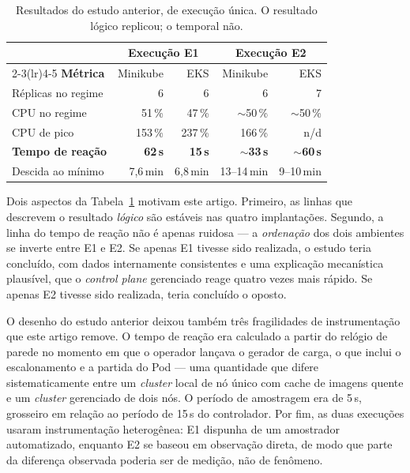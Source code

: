 \documentclass[conference]{IEEEtran}
\begin{document}
\begin{table}[!t]
\centering
\caption{Resultados do estudo anterior, de execução única. O resultado lógico
replicou; o temporal não.}
\label{tab:anterior}
\scriptsize
\begin{tabular}{@{}lrrrr@{}}
\toprule
& \multicolumn{2}{c}{\textbf{Execução E1}} & \multicolumn{2}{c}{\textbf{Execução E2}}\\
\cmidrule(lr){2-3}\cmidrule(lr){4-5}
\textbf{Métrica} & Minikube & EKS & Minikube & EKS\\
\midrule
Réplicas no regime & 6 & 6 & 6 & 7\\
CPU no regime & 51\,\% & 47\,\% & $\sim$50\,\% & $\sim$50\,\%\\
CPU de pico & 153\,\% & 237\,\% & 166\,\% & n/d\\
\textbf{Tempo de reação} & \textbf{62\,s} & \textbf{15\,s} & \textbf{$\sim$33\,s} & \textbf{$\sim$60\,s}\\
Descida ao mínimo & 7,6\,min & 6,8\,min & 13--14\,min & 9--10\,min\\
\bottomrule
\end{tabular}
\end{table}

Dois aspectos da Tabela~\ref{tab:anterior} motivam este artigo. Primeiro, as
linhas que descrevem o resultado \emph{lógico} são estáveis nas quatro
implantações. Segundo, a linha do tempo de reação não é apenas ruidosa --- a
\emph{ordenação} dos dois ambientes se inverte entre E1 e E2. Se apenas E1
tivesse sido realizada, o estudo teria concluído, com dados internamente
consistentes e uma explicação mecanística plausível, que o \emph{control plane}
gerenciado reage quatro vezes mais rápido. Se apenas E2 tivesse sido realizada,
teria concluído o oposto.

O desenho do estudo anterior deixou também três fragilidades de instrumentação
que este artigo remove. O tempo de reação era calculado a partir do relógio de
parede no momento em que o operador lançava o gerador de carga, o que inclui o
escalonamento e a partida do Pod --- uma quantidade que difere
sistematicamente entre um \emph{cluster} local de nó único com cache de imagens
quente e um \emph{cluster} gerenciado de dois nós. O período de amostragem era de
5\,s, grosseiro em relação ao período de 15\,s do controlador. Por fim, as duas
execuções usaram instrumentação heterogênea: E1 dispunha de um amostrador
automatizado, enquanto E2 se baseou em observação direta, de modo que parte da
diferença observada poderia ser de medição, não de fenômeno.
\end{document}
